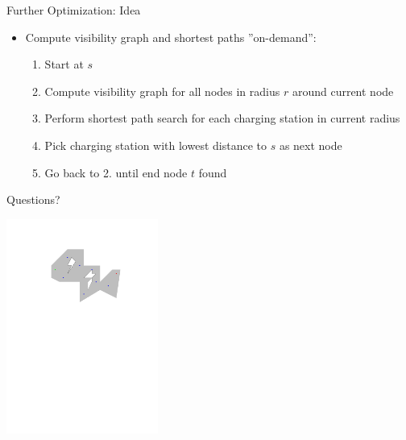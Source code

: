 \begin{frame}[t]{Further Optimization: Idea}

\begin{itemize}
    \item Compute visibility graph and shortest paths ''on-demand'':
    \begin{enumerate}
        \item Start at $s$
        \item Compute visibility graph for all nodes in radius $r$ around current node
        \item Perform shortest path search for each charging station in current radius
        \item Pick charging station with lowest distance to $s$ as next node
        \item Go back to 2. until end node $t$  found
    \end{enumerate}
\end{itemize}

\vspace{2em}

\begin{center}
%
%
\end{center}

\end{frame}

\begin{frame}{Questions?}

\begin{center}
\includegraphics[page=12,height=200pt]{graphics/algo_basic.pdf}
\end{center}

\end{frame}
